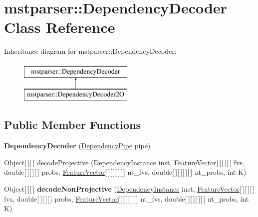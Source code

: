 \hypertarget{classmstparser_1_1DependencyDecoder}{
\section{mstparser::DependencyDecoder Class Reference}
\label{classmstparser_1_1DependencyDecoder}
}
Inheritance diagram for mstparser::DependencyDecoder:\begin{figure}[H]
\begin{center}
\leavevmode
\includegraphics[height=2cm]{classmstparser_1_1DependencyDecoder}
\end{center}
\end{figure}
\subsection*{Public Member Functions}
\begin{DoxyCompactItemize}
\item 
\hypertarget{classmstparser_1_1DependencyDecoder_a185a21e3127cfda5b92d26fc66a754c9}{
{\bfseries DependencyDecoder} (\hyperlink{classmstparser_1_1DependencyPipe}{DependencyPipe} pipe)}
\label{classmstparser_1_1DependencyDecoder_a185a21e3127cfda5b92d26fc66a754c9}

\item 
Object\mbox{[}$\,$\mbox{]}\mbox{[}$\,$\mbox{]} \hyperlink{classmstparser_1_1DependencyDecoder_a59cae69b2c0146f3212968ba5b65c4b2}{decodeProjective} (\hyperlink{classmstparser_1_1DependencyInstance}{DependencyInstance} inst, \hyperlink{classmstparser_1_1FeatureVector}{FeatureVector}\mbox{[}$\,$\mbox{]}\mbox{[}$\,$\mbox{]}\mbox{[}$\,$\mbox{]} fvs, double\mbox{[}$\,$\mbox{]}\mbox{[}$\,$\mbox{]}\mbox{[}$\,$\mbox{]} probs, \hyperlink{classmstparser_1_1FeatureVector}{FeatureVector}\mbox{[}$\,$\mbox{]}\mbox{[}$\,$\mbox{]}\mbox{[}$\,$\mbox{]}\mbox{[}$\,$\mbox{]} nt\_\-fvs, double\mbox{[}$\,$\mbox{]}\mbox{[}$\,$\mbox{]}\mbox{[}$\,$\mbox{]}\mbox{[}$\,$\mbox{]} nt\_\-probs, int K)
\item 
\hypertarget{classmstparser_1_1DependencyDecoder_a64a0c62cd4fab571a66ed7d89ab7863a}{
Object\mbox{[}$\,$\mbox{]}\mbox{[}$\,$\mbox{]} {\bfseries decodeNonProjective} (\hyperlink{classmstparser_1_1DependencyInstance}{DependencyInstance} inst, \hyperlink{classmstparser_1_1FeatureVector}{FeatureVector}\mbox{[}$\,$\mbox{]}\mbox{[}$\,$\mbox{]}\mbox{[}$\,$\mbox{]} fvs, double\mbox{[}$\,$\mbox{]}\mbox{[}$\,$\mbox{]}\mbox{[}$\,$\mbox{]} probs, \hyperlink{classmstparser_1_1FeatureVector}{FeatureVector}\mbox{[}$\,$\mbox{]}\mbox{[}$\,$\mbox{]}\mbox{[}$\,$\mbox{]}\mbox{[}$\,$\mbox{]} nt\_\-fvs, double\mbox{[}$\,$\mbox{]}\mbox{[}$\,$\mbox{]}\mbox{[}$\,$\mbox{]}\mbox{[}$\,$\mbox{]} nt\_\-probs, int K)}
\label{classmstparser_1_1DependencyDecoder_a64a0c62cd4fab571a66ed7d89ab7863a}

\end{DoxyCompactItemize}
